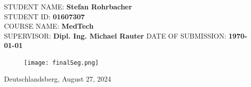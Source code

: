 \makeatletter

\begin{titlepage}
	\thispagestyle{empty}
	\vspace*{\dimexpr-1cm-\topmargin-\headsep-\headheight-\baselineskip}%
	\hspace*{\dimexpr-4cm-\evensidemargin-\parindent}%

	\begin{center}
		{\noindent \linespread{1.3} \color{header-blue} \Huge \textbf{\@title} \par }
		\vspace{5pt}
		\vspace{20pt}
	\end{center}
	\hspace{-35mm}

	\vspace{15pt}
	\tabto{2cm}STUDENT NAME: \tabto{7cm}\textbf{Stefan Rohrbacher} \\
	\tabto{2cm}STUDENT ID: \tabto{7cm}\textbf{01607307} \\
	\tabto{2cm}COURSE NAME: \tabto{7cm}\textbf{MedTech}\\
	\vspace{15pt}
	\tabto{2cm}SUPERVISOR: \tabto{7cm}\textbf{Dipl. Ing. Michael Rauter}
	\tabto{2cm}DATE OF SUBMISSION: \tabto{7cm}\textbf{\today}

	\vspace{15pt}

	\begin{figure}[h!] %
		\centerline{ %
			\texttt{[image: finalSeg.png]}}
	\end{figure}

	\vfill

	Deutschlandsberg, August 27, 2024

\end{titlepage}
\makeatother

